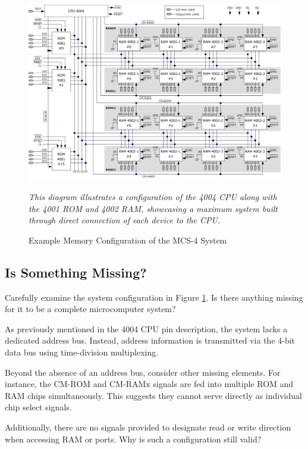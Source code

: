 \begin{figure}[h]
    \includegraphics[width=1.0\columnwidth]{./Figure/MCS4System(1).png}
    \caption{Example Memory Configuration of the MCS-4 System}
    \textit{This diagram illustrates a configuration of the 4004 CPU along with the 4001 ROM and 4002 RAM, showcasing a maximum system built through direct connection of each device to the CPU.}
    \label{fig:MCS4SYSTEM1}
\end{figure}

\subsection{Is Something Missing?}
Carefully examine the system configuration in Figure \ref{fig:MCS4SYSTEM1}.  
Is there anything missing for it to be a complete microcomputer system?

As previously mentioned in the 4004 CPU pin description, the system lacks a dedicated address bus.
Instead, address information is transmitted via the 4-bit data bus using time-division multiplexing.

Beyond the absence of an address bus, consider other missing elements.  
For instance, the $\overline{\text{CM-ROM}}$ and $\overline{\text{CM-RAMx}}$ signals are fed into multiple ROM and RAM chips simultaneously.  
This suggests they cannot serve directly as individual chip select signals.

Additionally, there are no signals provided to designate read or write direction when accessing RAM or ports.  
Why is such a configuration still valid?


